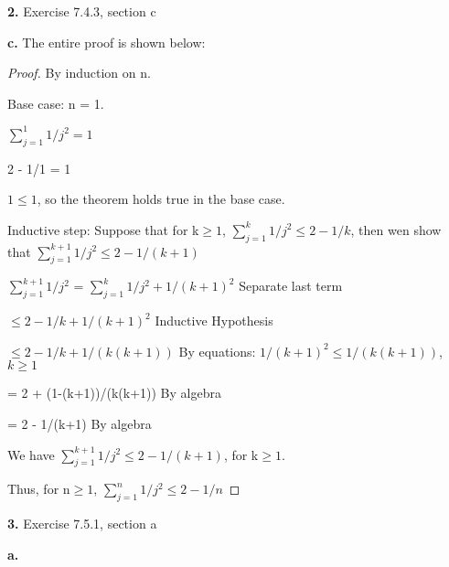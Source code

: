 \documentclass[11pt]{article}
\begin{document}
	\vspace{20mm}
	\textbf{2. }Exercise 7.4.3, section c
	
	\textbf{c.}
	The entire proof is shown below:
	\begin{proof}
	By induction on n.
	
	Base case: n = 1.
	
	$\sum_{j=1}^1 1/j^2 = 1$
	
	2 - 1/1 = 1
	
	$1\leq 1$, so the theorem holds true in the base case.
	
	Inductive step: Suppose that for k$\geq 1$, $\sum_{j=1}^k 1/j^2 \leq 2-1/k$, then wen show that $\sum_{j=1}^{k+1} 1/j^2 \leq 2-1/(k+1)$
	
	$\sum_{j=1}^{k+1} 1/j^2$ = $\sum_{j=1}^k 1/j^2 + 1/(k+1)^2$ \hspace{2mm} Separate last term
	
\hspace{18mm}	$\leq 2-1/k+1/(k+1)^2$\hspace{8mm} Inductive Hypothesis
	
\hspace{18mm}	$\leq 2-1/k+1/(k(k+1))$ \hspace{3mm} By equations: $1/(k+1)^2\leq 1/(k(k+1))$, $k\geq 1$
	
\hspace{18mm}	= 2 + (1-(k+1))/(k(k+1))\hspace{2.5mm} By algebra
	
\hspace{18mm}	= 2 - 1/(k+1)\hspace{24mm} By algebra
	
	We have $\sum_{j=1}^{k+1} 1/j^2 \leq 2-1/(k+1)$, for k$\geq 1$.
	
	Thus, for n$\geq 1$, $\sum_{j=1}^n 1/j^2 \leq 2-1/n$
	
	\end{proof}
	
	
	
	\vspace{20mm}
	\textbf{3.} Exercise 7.5.1, section a
	
	\textbf{a.}
	
	

	
	
\end{document}
